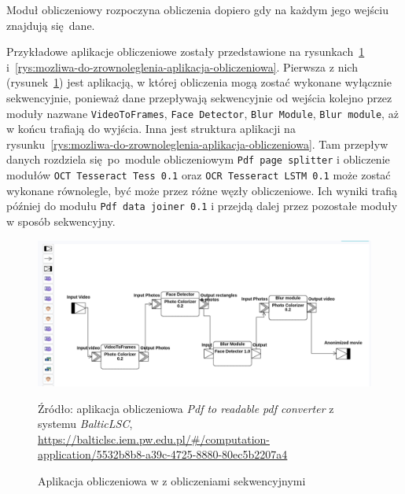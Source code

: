 Moduł obliczeniowy rozpoczyna obliczenia dopiero gdy na każdym jego wejściu
znajdują się dane.

Przykładowe aplikacje obliczeniowe zostały przedstawione na
rysunkach~\ref{rys:sekwencyjna-aplikacja-obliczeniowa}
i~\ref{rys:mozliwa-do-zrownoleglenia-aplikacja-obliczeniowa}.
Pierwsza z nich (rysunek~\ref{rys:sekwencyjna-aplikacja-obliczeniowa}) jest
aplikacją, w której obliczenia mogą zostać wykonane
wyłącznie sekwencyjnie, ponieważ dane przepływają sekwencyjnie od wejścia
kolejno przez moduły nazwane \texttt{VideoToFrames}, \texttt{Face Detector},
\texttt{Blur Module}, \texttt{Blur module}, aż w końcu trafiają do wyjścia.
Inna jest struktura aplikacji na
rysunku~\ref{rys:mozliwa-do-zrownoleglenia-aplikacja-obliczeniowa}. Tam
przepływ danych rozdziela się~po~module obliczeniowym \texttt{Pdf page
	splitter} i obliczenie modułów \texttt{OCT Tesseract Tess 0.1} oraz
\texttt{OCR Tesseract LSTM 0.1} może zostać wykonane równolegle, być może
przez różne węzły obliczeniowe. Ich wyniki trafią później do modułu \texttt{Pdf
	data joiner 0.1} i przejdą dalej przez pozostałe moduły w sposób
sekwencyjny.

\begin{figure}[!ht]
	\centering

	\includegraphics[width=0.95\linewidth]{./images/balticlsc-example-diagram.png}
	\caption{Aplikacja obliczeniowa w \BalticLSC{} z obliczeniami
		sekwencyjnymi}\label{rys:sekwencyjna-aplikacja-obliczeniowa}
	\medskip
	{\small Źródło: aplikacja obliczeniowa \emph{Pdf to readable pdf converter} z
		systemu \emph{BalticLSC},\\
		\url{https://balticlsc.iem.pw.edu.pl/#/computation-application/5532b8b8-a39c-4725-8880-80ec5b2207a4}
  }
\end{figure}

